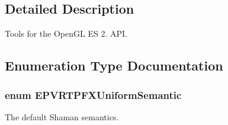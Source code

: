 \subsection{Detailed Description}
Tools for the Open\+G\+L E\+S 2. A\+P\+I. 



\subsection{Enumeration Type Documentation}
\hypertarget{group___a_p_i___o_g_l_e_s2_ga4a99c52103a64bb5e0359a67411f3382}{
\subsubsection[{E\+P\+V\+R\+T\+P\+F\+X\+Uniform\+Semantic}]{\setlength{\rightskip}{0pt plus 5cm}enum {\bf E\+P\+V\+R\+T\+P\+F\+X\+Uniform\+Semantic}}}\label{group___a_p_i___o_g_l_e_s2_ga4a99c52103a64bb5e0359a67411f3382}


The default Shaman semantics. 



